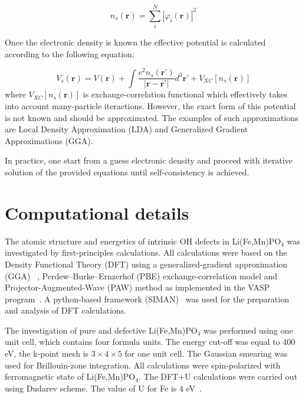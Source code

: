 \begin{equation}
n_s(\textbf{r}) = \sum\limits_{i}^N|\varphi_i (\textbf{r})|^2
\label{eq:n}
\end{equation}

Once the electronic density is known the effective  potential is calculated according to the following equation:

\begin{equation}
V_s (\textbf{r}) = V (\textbf{r}) + \int \frac{e^2 n_s (\textbf{r'})}{|\textbf{r}-\textbf{r'}|}d^3 \textbf{r'} + V_{XC} [n_s(\textbf{r})]
\label{eq:V}
\end{equation}
where $V_{XC} [n_s(\textbf{r})]$ is exchange-correlation functional which effectively takes into account many-particle iteractions. However, the exact form of this potential is not known and should be approximated. The examples of such approximations are Local Density Approximation (LDA) and Generalized Gradient Approximations (GGA). 

In practice, one start from a guess electronic density and proceed with iterative solution of the provided equations until self-consistency is achieved.


\section{Computational details}

The atomic structure and energetics of intrinsic OH defects in Li(Fe,Mn)PO$_4$ was investigated by first-principles calculations. All calculations were based on the Density Functional Theory (DFT) using a generalized-gradient approximation (GGA) ~\cite{perdew1996generalized}, Perdew–Burke–Ernzerhof (PBE) exchange-correlation model and Projector-Augmented-Wave (PAW) method  as implemented in the VASP program~\cite{kresse1996efficiency}. A python-based framework (SIMAN)~\cite{siman} was used for the preparation and analysis of DFT calculations.

The investigation of pure and defective Li(Fe,Mn)PO$_4$ was performed using one unit cell, which contains four formula units.
The energy cut-off was equal to 400 eV, the k-point mesh is $3\times 4 \times 5$ for one unit cell.
The Gaussian smearing was used for Brillouin-zone integration.  All calculations were spin-polarized with ferromagnetic state of Li(Fe,Mn)PO$_4$. The DFT+U calculations were carried out using Dudarev scheme. The value of U for Fe is 4 eV~\cite{jain2011high}.


